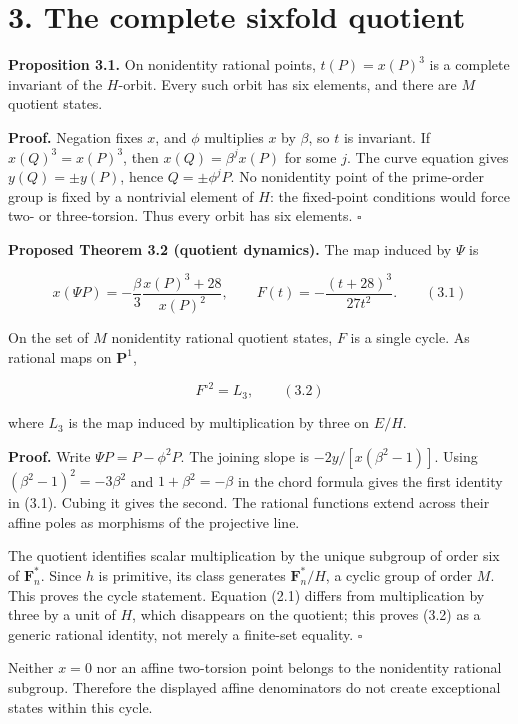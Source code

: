 \documentclass[
  11pt,
  a4paper,
]{article}
\begin{document}
\section{3. The complete sixfold
quotient}\label{the-complete-sixfold-quotient}

\textbf{Proposition 3.1.} On nonidentity rational points,
\(t(P)=x(P)^3\) is a complete invariant of the \(H\)-orbit. Every such
orbit has six elements, and there are \(M\) quotient states.

\textbf{Proof.} Negation fixes \(x\), and \(\phi\) multiplies \(x\) by
\(\beta\), so \(t\) is invariant. If \(x(Q)^3=x(P)^3\), then
\(x(Q)=\beta^j x(P)\) for some \(j\). The curve equation gives
\(y(Q)=\pm y(P)\), hence \(Q=\pm\phi^jP\). No nonidentity point of the
prime-order group is fixed by a nontrivial element of \(H\): the
fixed-point conditions would force two- or three-torsion. Thus every
orbit has six elements. \(\square\)

\textbf{Proposed Theorem 3.2 (quotient dynamics).} The map induced by
\(\Psi\) is

\[
x(\Psi P)=-\frac{\beta}{3}\frac{x(P)^3+28}{x(P)^2},\qquad
F(t)=-\frac{(t+28)^3}{27t^2}. \qquad (3.1)
\]

On the set of \(M\) nonidentity rational quotient states, \(F\) is a
single cycle. As rational maps on \(\mathbf P^1\),

\[
F^{\circ2}=L_3, \qquad (3.2)
\]

where \(L_3\) is the map induced by multiplication by three on \(E/H\).

\textbf{Proof.} Write \(\Psi P=P-\phi^2P\). The joining slope is
\(-2y/[x(\beta^2-1)]\). Using \((\beta^2-1)^2=-3\beta^2\) and
\(1+\beta^2=-\beta\) in the chord formula gives the first identity in
(3.1). Cubing it gives the second. The rational functions extend across
their affine poles as morphisms of the projective line.

The quotient identifies scalar multiplication by the unique subgroup of
order six of \(\mathbf F_n^*\). Since \(h\) is primitive, its class
generates \(\mathbf F_n^*/H\), a cyclic group of order \(M\). This
proves the cycle statement. Equation (2.1) differs from multiplication
by three by a unit of \(H\), which disappears on the quotient; this
proves (3.2) as a generic rational identity, not merely a finite-set
equality. \(\square\)

Neither \(x=0\) nor an affine two-torsion point belongs to the
nonidentity rational subgroup. Therefore the displayed affine
denominators do not create exceptional states within this cycle.
\end{document}
